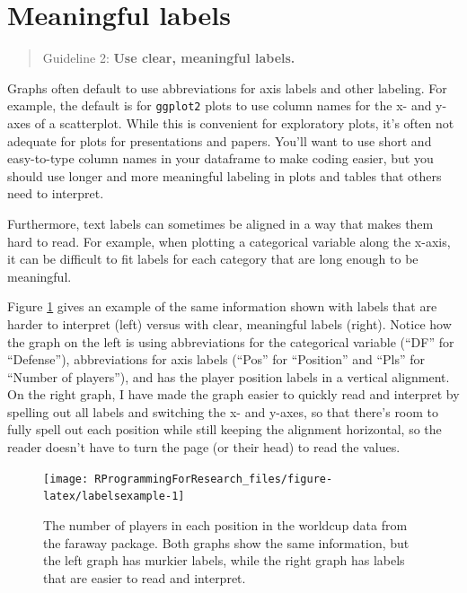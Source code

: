 \documentclass[]{book}
\begin{document}
\section{Meaningful labels}\label{meaningful-labels}

\begin{quote}
Guideline 2: \textbf{Use clear, meaningful labels.}
\end{quote}

Graphs often default to use abbreviations for axis labels and other
labeling. For example, the default is for \texttt{ggplot2} plots to use
column names for the x- and y-axes of a scatterplot. While this is
convenient for exploratory plots, it's often not adequate for plots for
presentations and papers. You'll want to use short and easy-to-type
column names in your dataframe to make coding easier, but you should use
longer and more meaningful labeling in plots and tables that others need
to interpret.

Furthermore, text labels can sometimes be aligned in a way that makes
them hard to read. For example, when plotting a categorical variable
along the x-axis, it can be difficult to fit labels for each category
that are long enough to be meaningful.

Figure \ref{fig:labelsexample} gives an example of the same information
shown with labels that are harder to interpret (left) versus with clear,
meaningful labels (right). Notice how the graph on the left is using
abbreviations for the categorical variable (``DF'' for ``Defense''),
abbreviations for axis labels (``Pos'' for ``Position'' and ``Pls'' for
``Number of players''), and has the player position labels in a vertical
alignment. On the right graph, I have made the graph easier to quickly
read and interpret by spelling out all labels and switching the x- and
y-axes, so that there's room to fully spell out each position while
still keeping the alignment horizontal, so the reader doesn't have to
turn the page (or their head) to read the values.

\begin{figure}

{\centering \texttt{[image: RProgrammingForResearch\_files/figure-latex/labelsexample-1]} 

}

\caption{The number of players in each position in the worldcup data from the faraway package. Both graphs show the same information, but the left graph has murkier labels, while the right graph has labels that are easier to read and interpret.}\label{fig:labelsexample}
\end{figure}
\end{document}
